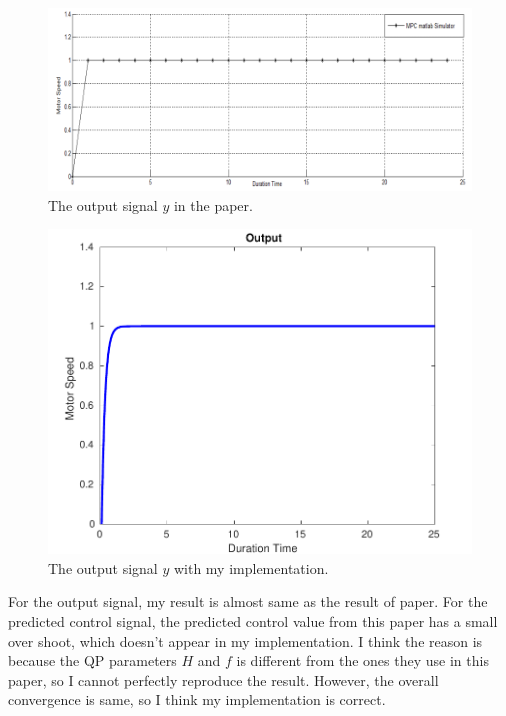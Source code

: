 \documentclass{article}
\begin{document}
\begin{minipage}{\textwidth}
    \begin{minipage}{0.6\textwidth}
        \begin{figure}[H]
            \centering
            \includegraphics[width=\textwidth]{src/ori_output.png}
            \caption{The output signal $y$ in the paper.}
            \label{fig:ori-output}
        \end{figure}
    \end{minipage}
    \begin{minipage}{0.4\textwidth}
        \begin{figure}[H]
            \centering
            \includegraphics[width=\textwidth]{src/output.pdf}
            \caption{The output signal $y$ with my implementation.}
            \label{fig:output}
        \end{figure}
    \end{minipage}
\end{minipage}

For the output signal, my result is almost same as the result of paper. For the predicted control signal, the predicted control value from this paper 
has a small over shoot, which doesn't appear in my implementation.
I think the reason is because the QP parameters $H$ and $f$ is different from the ones they use in this paper, so I cannot perfectly reproduce
the result. However, the overall convergence is same, so I think my implementation is correct.
\end{document}
